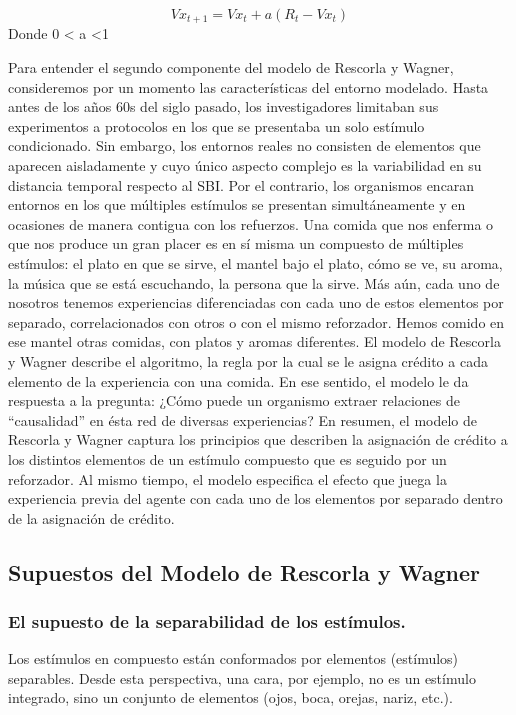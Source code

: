 \documentclass[
  letterpaper,
]{book}
\begin{document}
\[Vx_{t+1}= Vx_t + a (R_t -Vx_t)\] Donde 0 \textless{} a \textless1

Para entender el segundo componente del modelo de Rescorla y Wagner,
consideremos por un momento las características del entorno modelado.
Hasta antes de los años 60s del siglo pasado, los investigadores
limitaban sus experimentos a protocolos en los que se presentaba un solo
estímulo condicionado. Sin embargo, los entornos reales no consisten de
elementos que aparecen aisladamente y cuyo único aspecto complejo es la
variabilidad en su distancia temporal respecto al SBI. Por el contrario,
los organismos encaran entornos en los que múltiples estímulos se
presentan simultáneamente y en ocasiones de manera contigua con los
refuerzos. Una comida que nos enferma o que nos produce un gran placer
es en sí misma un compuesto de múltiples estímulos: el plato en que se
sirve, el mantel bajo el plato, cómo se ve, su aroma, la música que se
está escuchando, la persona que la sirve. Más aún, cada uno de nosotros
tenemos experiencias diferenciadas con cada uno de estos elementos por
separado, correlacionados con otros o con el mismo reforzador. Hemos
comido en ese mantel otras comidas, con platos y aromas diferentes. El
modelo de Rescorla y Wagner describe el algoritmo, la regla por la cual
se le asigna crédito a cada elemento de la experiencia con una comida.
En ese sentido, el modelo le da respuesta a la pregunta: ¿Cómo puede un
organismo extraer relaciones de ``causalidad'' en ésta red de diversas
experiencias? En resumen, el modelo de Rescorla y Wagner captura los
principios que describen la asignación de crédito a los distintos
elementos de un estímulo compuesto que es seguido por un reforzador. Al
mismo tiempo, el modelo especifica el efecto que juega la experiencia
previa del agente con cada uno de los elementos por separado dentro de
la asignación de crédito.

\subsection{Supuestos del Modelo de Rescorla y
Wagner}\label{supuestos-del-modelo-de-rescorla-y-wagner}

\subsubsection{El supuesto de la separabilidad de los
estímulos.}\label{el-supuesto-de-la-separabilidad-de-los-estuxedmulos.}

Los estímulos en compuesto están conformados por elementos (estímulos)
separables. Desde esta perspectiva, una cara, por ejemplo, no es un
estímulo integrado, sino un conjunto de elementos (ojos, boca, orejas,
nariz, etc.).
\end{document}
